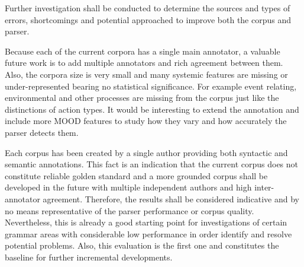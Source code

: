 Further investigation shall be conducted to determine the sources and types of errors, shortcomings and potential approached to improve both the corpus and parser. 

Because each of the current corpora has a single main annotator, a valuable future work is to add multiple annotators and rich agreement between them. Also, the corpora size is very small and many systemic features are missing or under-represented bearing no statistical significance. For example event relating, environmental and other processes are missing from the corpus just like the distinctions of action types. It would be interesting to extend the annotation and include more MOOD features to study how they vary and how accurately the parser detects them. 

Each corpus has been created by a single author providing both syntactic and semantic annotations. This fact is an indication that the current corpus does not constitute reliable golden standard and a more grounded corpus shall be developed in the future with multiple independent authors and high inter-annotator agreement. Therefore, the results shall be considered indicative and by no means representative of the parser performance or corpus quality. Nevertheless, this is already a good starting point for investigations of certain grammar areas with considerable low performance in order identify and resolve potential problems. Also, this evaluation is the first one and constitutes the baseline for further incremental developments.

